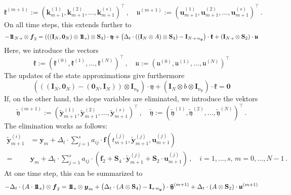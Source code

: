 \documentclass{article}
\newcommand{\defeq}{\mathrel{:=}}%
\newcommand{\tp}{\top}%
\newcommand{\kron}{\otimes}%
\newcommand{\vectorfont}[1]{\boldsymbol{#1}}%
\newcommand{\greekvectorfont}[1]{\boldsymbol{#1}}%
\newcommand{\matrixfont}[1]{\mathbf{#1}}%
\newcommand{\fvec}{\vectorfont{f}}
\newcommand{\kvec}{\vectorfont{k}}
\newcommand{\uvec}{\vectorfont{u}}
\newcommand{\yvec}{\vectorfont{y}}
\newcommand{\tildeyvec}{\vectorfont{\tilde{y}}}
\newcommand{\kfrakvec}{\vectorfont{\mathfrak{k}}}
\newcommand{\ufrakvec}{\vectorfont{\mathfrak{u}}}
\newcommand{\yfrakvec}{\vectorfont{\mathfrak{y}}}
\newcommand{\tildeyfrakvec}{\vectorfont{\tilde{\mathfrak{y}}}}
\newcommand{\nullvec}{\greekvectorfont{0}}
\newcommand{\einsvec}{\vectorfont{1}\negthinspace\negthinspace\vectorfont{1}} %
\newcommand{\Imat}{\matrixfont{I}}%
\newcommand{\Smat}{\matrixfont{S}}
\begin{document}
\begin{equation*}
\kfrakvec^{(m+1)} \defeq (\kvec_{m+1}^{(1)}, \kvec_{m+1}^{(2)}, \ldots, \kvec_{m+1}^{(s)})^{\tp}\,,
\quad
\ufrakvec^{(m+1)} \defeq (\uvec_{m+1}^{(1)}, \uvec_{m+1}^{(2)}, \ldots, \uvec_{m+1}^{(s)})^{\tp}\,.
\end{equation*}
On all time steps, this extends further to
\[
-\einsvec_{N\cdot s}\kron \fvec_2
 = \left(((\Imat_N ,\nullvec_N)\kron \einsvec_s) \kron \Smat_4 \right) \cdot \yfrakvec
  + \left( \Delta_t \cdot ((\Imat_N \kron A)\kron \Smat_4) - \Imat_{N\cdot s \cdot n_{\yvec}}\right)\cdot \kfrakvec  + (\Imat_{N\cdot s}\kron \Smat_2) \cdot \ufrakvec
\]
Here, we introduce the vectors
\[
\kfrakvec \defeq (\kfrakvec^{(0)}, \kfrakvec^{(1)}, \ldots , \kfrakvec^{(N)})^{\tp}\,,\quad
\ufrakvec \defeq (\ufrakvec^{(0)}, \ufrakvec^{(1)}, \ldots , \ufrakvec^{(N)})^{\tp}
\]
The updates of the state approximations give furthermore 
\[
\left(
((\Imat_N, \nullvec_N) - (\nullvec_N, \Imat_N)) \kron \Imat_{n_{\yvec}}
\right) \cdot \yfrakvec 
+ (\Imat_N \kron b \kron \Imat_{n_{\yvec}}) \cdot \kfrakvec = \nullvec
\]
If, on the other hand, the slope variables are eliminated, we introduce the vektors
\[
\tildeyfrakvec^{(m+1)} \defeq (\tildeyvec_{m+1}^{(1)}, \tildeyvec_{m+1}^{(2)}, \ldots, \tildeyvec_{m+1}^{(s)})^{\tp}\,,
\quad
\tildeyfrakvec \defeq (\tildeyfrakvec^{(1)}, \tildeyfrakvec^{(2)}, \ldots, \tildeyfrakvec^{(N)})^{\tp}\,.
\]
The elimination works as follows:
\begin{align*}
\tildeyvec_{m+1}^{(i)} &= \yvec_m + \Delta_t \cdot \sum_{j=1}^s a_{ij} \cdot \fvec(t_{m+1}^{(j)}, \tildeyvec_{m+1}^{(j)}, \uvec_{m+1}^{(j)})
\\
 =& \yvec_m + \Delta_t \cdot \sum_{j=1}^s a_{ij} \cdot \left( \fvec_2  + \Smat_4 \cdot \tildeyvec_{m+1}^{(j)} + \Smat_2 \cdot \uvec_{m+1}^{(j)}\right)\,,\quad i = 1 ,\ldots,s,\, m = 0,\ldots, N-1\,.
\end{align*}
At one time step, this can be summarized to
\[
-\Delta_t \cdot (A\cdot \einsvec_s) \kron \fvec_2 
 = \einsvec_s \kron \yvec_m + \left( \Delta_t \cdot (A \kron \Smat_4) - \Imat_{s \cdot n_{\yvec}} \right)\cdot \tildeyfrakvec^{(m+1)} + \Delta_t \cdot (A \kron \Smat_2) \cdot \ufrakvec^{(m+1)}
\]
\end{document}
